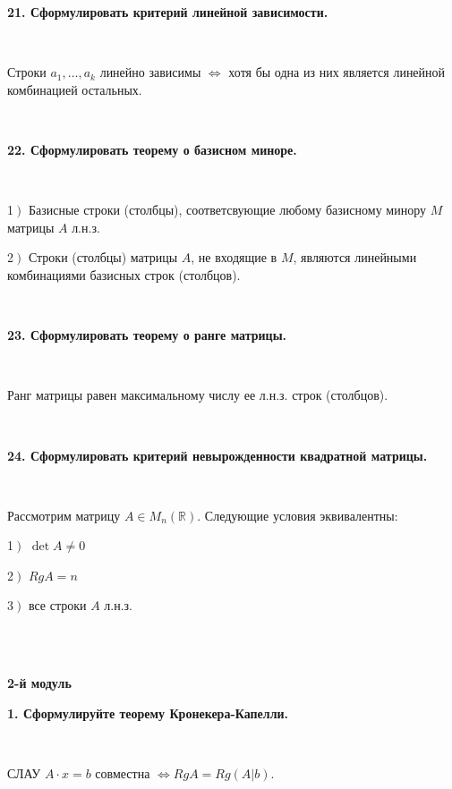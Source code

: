 \documentclass{article}
\begin{document}
	\textbf{21. Сформулировать критерий линейной зависимости.} 
	
	{
		$\;$
		\setlength{\parindent}{0.4cm}
		\hangindent=0.4cm
		
		Строки $a_1, \ldots, a_k$ линейно зависимы $\Leftrightarrow$ хотя бы одна из них является линейной комбинацией остальных.
		
		$\;$
		\setlength{\parindent}{0cm}
		\hangindent=0cm
	}
	
	\textbf{22. Сформулировать теорему о базисном миноре.} 
	
	{
		$\;$
		\setlength{\parindent}{0.4cm}
		\hangindent=0.4cm
		
		1$\left.\right)$ Базисные строки (столбцы), соответсвующие любому базисному минору $M$ матрицы $A$ л.н.з.
		
		2$\left.\right)$ Строки (столбцы) матрицы $A$, не входящие в $M$, являются линейными комбинациями базисных строк (столбцов).
		
		$\;$
		\setlength{\parindent}{0cm}
		\hangindent=0cm
	}
	
	\textbf{23. Сформулировать теорему о ранге матрицы.} 
	
	{
		$\;$
		\setlength{\parindent}{0.4cm}
		\hangindent=0.4cm
		
		Ранг матрицы равен максимальному числу ее л.н.з. строк (столбцов).
		
		$\;$
		\setlength{\parindent}{0cm}
		\hangindent=0cm
	}
	
	\textbf{24. Сформулировать критерий невырожденности квадратной матрицы.} 
	
	{
		$\;$
		\setlength{\parindent}{0.4cm}
		\hangindent=0.4cm
		
		Рассмотрим матрицу $A\in M_n(\mathbb{R})$. Следующие условия эквивалентны:
		
		1$\left.\right)$ $\det A\ne 0$
		
		2$\left.\right)$ $RgA=n$
		
		3$\left.\right)$ все строки $A$ л.н.з.\\
		
		$\;$
		\setlength{\parindent}{0cm}
		\hangindent=0cm
	}
	
	\Large
	\centering
	
	$\;$
	
	\textbf{2-й модуль}
	
	\flushleft
	\small
	
	\textbf{1. Сформулируйте теорему Кронекера-Капелли.} 
	
	{
		$\;$
		\setlength{\parindent}{0.4cm}
		\hangindent=0.4cm
		
		СЛАУ $A\cdot x=b$ совместна $\Leftrightarrow RgA=Rg(A|b)$.
		
		$\;$
		\setlength{\parindent}{0cm}
		\hangindent=0cm
	}
	
\end{document}

